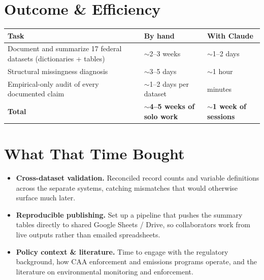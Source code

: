 \documentclass[11pt]{article}
\begin{document}
\section*{Outcome \& Efficiency}

\begin{center}
\renewcommand{\arraystretch}{1.3}
\begin{tabular}{@{}p{} p{} p{}@{}}
\toprule
\textbf{Task} & \textbf{By hand} & \textbf{With Claude} \\
\midrule
Document and summarize 17 federal datasets (dictionaries + tables)
  & $\sim$2--3 weeks & $\sim$1--2 days \\
Structural missingness diagnosis
  & $\sim$3--5 days & $\sim$1 hour \\
Empirical-only audit of every documented claim
  & $\sim$1--2 days per dataset & minutes \\
\midrule
\textbf{Total}
  & \textbf{$\sim$4--5 weeks of solo work}
  & \textbf{$\sim$1 week of sessions} \\
\bottomrule
\end{tabular}
\end{center}

\section*{What That Time Bought}

\begin{itemize}
  \item \textbf{Cross-dataset validation.} Reconciled record counts and variable definitions across the separate systems, catching mismatches that would otherwise surface much later.
  \item \textbf{Reproducible publishing.} Set up a pipeline that pushes the
        summary tables directly to shared Google Sheets / Drive, so
        collaborators work from live outputs rather than emailed spreadsheets.
  \item \textbf{Policy context \& literature.} Time to engage with the
        regulatory background, how CAA enforcement and emissions programs
        operate, and the literature on environmental monitoring and enforcement.
\end{itemize}
\end{document}
